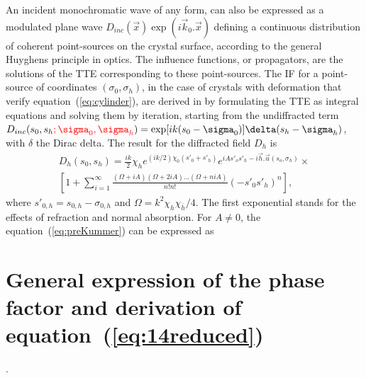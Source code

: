 \documentclass[preprint]{iucr}              %
\newcommand{\inred}[1]{{\color{red}#1}}
\begin{document}
An incident monochromatic wave of any form, can also be expressed as a modulated plane wave $D_{inc}(\vec x)\exp(i\vec k_0. \vec x)$ defining a continuous distribution of coherent point-sources on the crystal surface, according to the general Huyghens principle in optics. The influence functions, or propagators, are the solutions of the TTE corresponding to these point-sources. The IF for a point-source of coordinates $(\sigma_0,\sigma_h)$, in the case of crystals with deformation that verify equation~(\ref{eq:cylinder}), are derived in \cite{GuigayFerrero2016} by formulating the TTE as integral equations and solving them by iteration, starting from the undiffracted term $D_{inc}(s_0,s_h\inred{;\sigma_0,\sigma_h})=\exp[ik(s_0-\sigma_0)]\delta(s_h-\sigma_h)$, with $\delta$ the Dirac delta. The result for the diffracted field $D_h$ is
\begin{multline}
\label{eq:preKummer}
    D_h(s_0,s_h) =  \frac{i k}{2} \chi_h e^{(ik/2) \chi_0 (s'_0 + s'_h)} e^{i A s'_o s'_h - i\vec h.\vec u(s_o,\sigma_h)} \times
    \\
    [1 + \sum_{i=1}^\infty \frac{(\Omega + i A )(\Omega+2iA)...(\Omega+niA)}{n!n!}(-s'_0s'_h)^n],
\end{multline}
where $s'_{0,h}=s_{0,h}-\sigma_{0,h}$ and $\Omega = k^2 \chi_h \chi_{\bar h}/4$. The first exponential stands for the effects of refraction and normal absorption. For $A\ne0$, the equation~(\ref{eq:preKummer}) can be expressed as
  






\section{General expression of the phase factor and derivation of equation~(\ref{eq:14reduced})}
\label{appendix:Deformation}.
\end{document}
